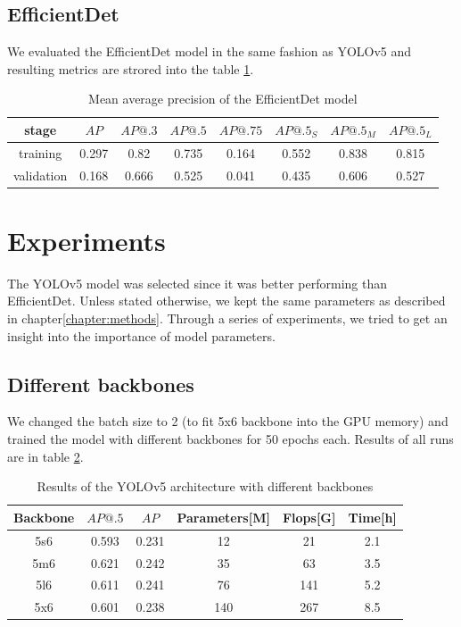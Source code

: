 \subsection{EfficientDet}
We evaluated the EfficientDet model in the same fashion as YOLOv5 and resulting metrics are strored into the table \ref{tab:effdet_basic}.
\begin{table}
    \begin{tabular}{c|c|c|c|c|c|c|c}
        stage      & $AP$  & $AP@.3$ & $AP@.5$ & $AP@.75$ & $AP@.5_S$ & $AP@.5_M$ & $AP@.5_L$ \\ \hline
        training   & 0.297 & 0.82    & 0.735   & 0.164    & 0.552     & 0.838     & 0.815     \\ \hline
        validation & 0.168 & 0.666   & 0.525   & 0.041    & 0.435     & 0.606     & 0.527     \\
    \end{tabular}
    \caption{Mean average precision of the EfficientDet model}
    \label{tab:effdet_basic}
\end{table}


\section{Experiments}
The YOLOv5 model was selected since it was better performing than EfficientDet. Unless stated otherwise, we kept the same parameters as described in chapter\ref{chapter:methods}. Through a series of experiments, we tried to get an insight into the importance of model parameters.
\subsection{Different backbones}
We changed the batch size to 2 (to fit 5x6 backbone into the GPU memory) and trained the model with different backbones for 50 epochs each. Results of all runs are in table \ref{tab:yolov5_backbones}.

\begin{table}
    \begin{tabular}{c|c|c|c|c|c}
        Backbone & $AP@.5$ & $AP$  & Parameters[M] & Flops[G] & Time[h] \\ \hline
        5s6      & 0.593   & 0.231 & 12            & 21       & 2.1     \\ \hline
        5m6      & 0.621   & 0.242 & 35            & 63       & 3.5     \\ \hline
        5l6      & 0.611   & 0.241 & 76            & 141      & 5.2     \\ \hline
        5x6      & 0.601   & 0.238 & 140           & 267      & 8.5     \\
    \end{tabular}
    \caption{Results of the YOLOv5 architecture with different backbones}
    \label{tab:yolov5_backbones}
\end{table}

